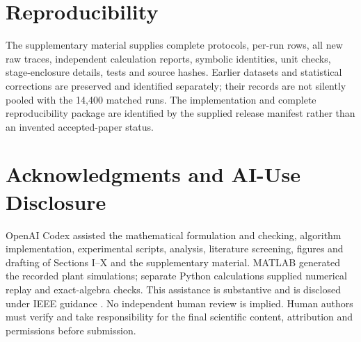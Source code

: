 \section*{Reproducibility}
The supplementary material supplies complete protocols, per-run rows, all new raw traces, independent calculation reports, symbolic identities, unit checks, stage-enclosure details, tests and source hashes. Earlier datasets and statistical corrections are preserved and identified separately; their records are not silently pooled with the 14,400 matched runs. The implementation and complete reproducibility package are identified by the supplied release manifest rather than an invented accepted-paper status.

\section*{Acknowledgments and AI-Use Disclosure}
OpenAI Codex assisted the mathematical formulation and checking, algorithm implementation, experimental scripts, analysis, literature screening, figures and drafting of Sections I--X and the supplementary material. MATLAB generated the recorded plant simulations; separate Python calculations supplied numerical replay and exact-algebra checks. This assistance is substantive and is disclosed under IEEE guidance \cite{aipolicy}. No independent human review is implied. Human authors must verify and take responsibility for the final scientific content, attribution and permissions before submission.
